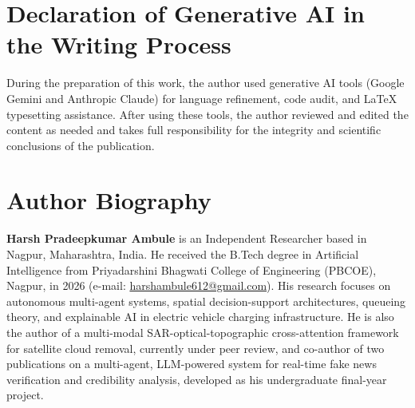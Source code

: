 \documentclass[preprint,12pt,authoryear]{elsarticle}
\begin{document}
\section*{Declaration of Generative AI in the Writing Process}
During the preparation of this work, the author used generative AI tools (Google Gemini and Anthropic Claude) for language refinement, code audit, and LaTeX typesetting assistance. After using these tools, the author reviewed and edited the content as needed and takes full responsibility for the integrity and scientific conclusions of the publication.

\section*{Author Biography}
\noindent\textbf{Harsh Pradeepkumar Ambule} is an Independent Researcher based in Nagpur, Maharashtra, India. He received the B.Tech degree in Artificial Intelligence from Priyadarshini Bhagwati College of Engineering (PBCOE), Nagpur, in 2026 (e-mail: \href{mailto:harshambule612@gmail.com}{harshambule612@gmail.com}). His research focuses on autonomous multi-agent systems, spatial decision-support architectures, queueing theory, and explainable AI in electric vehicle charging infrastructure. He is also the author of a multi-modal SAR-optical-topographic cross-attention framework for satellite cloud removal, currently under peer review, and co-author of two publications on a multi-agent, LLM-powered system for real-time fake news verification and credibility analysis, developed as his undergraduate final-year project.



\end{document}
